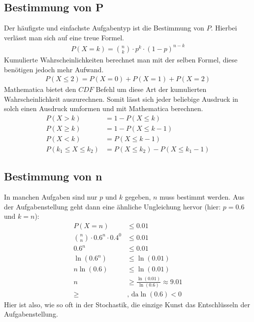 \subsection{Bestimmung von P}
\begin{flushleft}
    Der häufigste und einfachste Aufgabentyp ist die Bestimmung von $P$.
    Hierbei verlässt man sich auf eine treue Formel.
    \begin{align}
        P(X=k)=\binom{n}{k} \cdot p^k \cdot (1-p)^{n-k}
    \end{align}
    Kumulierte Wahrscheinlichkeiten berechnet man mit der selben Formel, diese benötigen
    jedoch mehr Aufwand.
    \begin{align}
        P(X \leq 2)=P(X=0)+P(X=1)+P(X=2)
    \end{align}
    Mathematica bietet den $CDF$ Befehl um diese Art der kumulierten Wahrscheinlichkeit auszurechnen.
    Somit lässt sich jeder beliebige Ausdruck in solch einen Ausdruck umformen und mit Mathematica berechnen.
    \begin{align}
        P(X>k) &= 1-P(X \leq k) \\
        P(X \geq k) &= 1-P(X \leq k-1) \\
        P(X<k) &= P(X \leq k-1) \\
        P(k_{1} \leq X \leq k_{2}) &= P(X \leq k_{2})-P(X \leq k_{1}-1)
    \end{align}
\end{flushleft}

\subsection{Bestimmung von n}
\begin{flushleft}
    In manchen Aufgaben sind nur $p$ und $k$ gegeben, $n$ muss bestimmt werden.
    Aus der Aufgabenstellung geht dann eine ähnliche Ungleichung hervor (hier: $p=0.6$ und $k=n$):
    \begin{align}
        P(X=n) &\leq 0.01 \\
        \binom{n}{n} \cdot 0.6^n \cdot 0.4^0 &\leq 0.01 \\
        0.6^n &\leq 0.01 \\
        \ln(0.6^n) &\leq \ln(0.01) \\
        n\ln(0.6) &\leq \ln(0.01) \\
        n &\geq \frac{\ln(0.01)}{\ln(0.6)} \approx 9.01 \\
        \geq &\text{, da} \ln(0.6)<0
    \end{align}
    Hier ist also, wie so oft in der Stochastik, die einzige Kunst das Entschlüsseln der Aufgabenstellung.
\end{flushleft}


